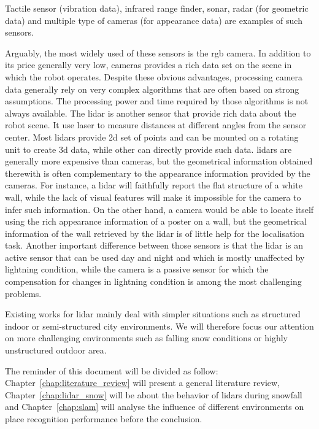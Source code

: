 Tactile sensor (vibration data), infrared range finder, \gls*{sonar}, \gls*{radar} (for geometric data) and multiple type of cameras (for appearance data) are examples of such sensors. 

Arguably, the most widely used of these sensors is the \gls*{rgb} camera. In addition to its price generally very low, cameras provides a rich data set on the scene in which the robot operates. Despite these obvious advantages, processing camera data generally rely on very complex algorithms that are often based on strong assumptions. The processing power and time required by those algorithms is not always available. The \gls*{lidar} is another sensor that provide rich data about the robot scene. It use laser to measure distances at different angles from the sensor center. Most \gls*{lidar}s provide \gls*{2d} set of points and can be mounted on a rotating unit to create \gls*{3d} data, while other can directly provide such data. \gls*{lidar}s are generally more expensive than cameras, but the geometrical information obtained therewith is often complementary to the appearance information provided by the cameras. For instance, a \gls*{lidar} will faithfully report the flat structure of a white wall, while the lack of visual features will make it impossible for the camera to infer such information. On the other hand, a camera would be able to locate itself using the rich appearance information of a poster on a wall, but the geometrical information of the wall retrieved by the \gls*{lidar} is of little help for the localisation task. Another important difference between those sensors is that the \gls*{lidar} is an active sensor that can be used day and night and which is mostly unaffected by lightning condition, while the camera is a passive sensor for which the compensation for changes in lightning condition is among the most challenging problems.

Existing works for \gls*{lidar} mainly deal with simpler situations such as structured indoor or semi-structured city environments. We will therefore focus our attention on more challenging environments such as falling snow conditions or highly unstructured outdoor area. 


The reminder of this document will be divided as follow: Chapter~\ref{chap:literature_review} will present a general literature review, Chapter~\ref{chap:lidar_snow} will be about the behavior of \gls*{lidar}s during snowfall and Chapter~\ref{chap:slam} will analyse the influence of different environments on place recognition performance before the conclusion.
